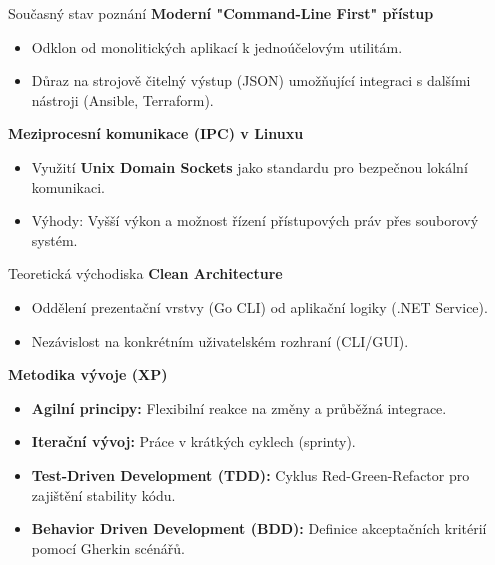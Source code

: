 \documentclass[aspectratio=169, 12pt]{beamer}
\begin{document}
\begin{frame}{Současný stav poznání}
    \textbf{Moderní "Command-Line First" přístup}
    \begin{itemize}
        \item Odklon od monolitických aplikací k jednoúčelovým utilitám.
        \item Důraz na strojově čitelný výstup (JSON) umožňující integraci s dalšími nástroji (Ansible, Terraform).
    \end{itemize}
    
    \vspace{0.5cm}
    
    \textbf{Meziprocesní komunikace (IPC) v Linuxu}
    \begin{itemize}
        \item Využití \textbf{Unix Domain Sockets} jako standardu pro bezpečnou lokální komunikaci.
        \item Výhody: Vyšší výkon a možnost řízení přístupových práv přes souborový systém.
    \end{itemize}
\end{frame}

\begin{frame}{Teoretická východiska}
    \textbf{Clean Architecture}
    \begin{itemize}
        \item Oddělení prezentační vrstvy (Go CLI) od aplikační logiky (.NET Service).
        \item Nezávislost na konkrétním uživatelském rozhraní (CLI/GUI).
    \end{itemize}

    \vspace{0.3cm}

    \textbf{Metodika vývoje (XP)}
    \begin{itemize}
        \item \textbf{Agilní principy:} Flexibilní reakce na změny a průběžná integrace.
        \item \textbf{Iterační vývoj:} Práce v krátkých cyklech (sprinty).
        \item \textbf{Test-Driven Development (TDD):} Cyklus Red-Green-Refactor pro zajištění stability kódu.
        \item \textbf{Behavior Driven Development (BDD):} Definice akceptačních kritérií pomocí Gherkin scénářů.
    \end{itemize}
\end{frame}
\end{document}
